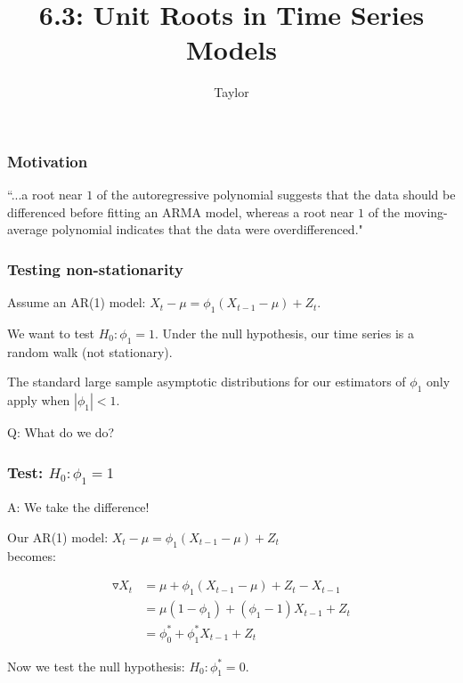\documentclass{beamer}
\title["6.3"]{6.3: Unit Roots in Time Series Models}
\author{Taylor}
\institute[UVA] 
{
University of Virginia \\
\medskip
\textit{} 
}
\date{}
\begin{document}

\begin{frame}
\titlepage 
\end{frame}


\begin{frame}
\frametitle{Motivation}

``...a root near $1$ of the autoregressive polynomial suggests that the data
should be differenced before fitting an ARMA model, whereas a root near $1$ of
the moving-average polynomial indicates that the data were overdifferenced."
\newline



\end{frame}


\begin{frame}
\frametitle{Testing non-stationarity}

Assume an AR(1) model: $X_t - \mu = \phi_1( X_{t-1} - \mu) + Z_t$. 
\newline

We want to test $H_0: \phi_1 = 1$. Under the null hypothesis, our time series is a random walk (not stationary). 
\newline

The standard large sample asymptotic distributions for our estimators of $\phi_1$ only apply when $|\phi_1| < 1$.
\newline

Q: What do we do?

\end{frame}


\begin{frame}
\frametitle{Test: $H_0: \phi_1 = 1$}

A: We take the difference!

Our AR(1) model: $X_t - \mu = \phi_1( X_{t-1} - \mu) + Z_t$ \\
becomes:

\begin{align*}
\triangledown X_t &=  \mu + \phi_1( X_{t-1} - \mu) + Z_t - X_{t-1} \\
&= \mu(1 - \phi_1) + ( \phi_1 - 1) X_{t-1} + Z_t \\
&= \phi^*_0 + \phi^*_1 X_{t-1} + Z_t
\end{align*}

Now we test the null hypothesis: $H_0: \phi^*_1 = 0$.

\end{frame}
\end{document}
